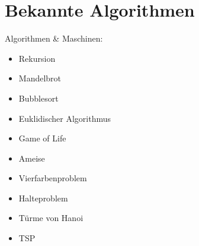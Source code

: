 \section{Bekannte Algorithmen}
%
Algorithmen \& Maschinen:
%
\begin{itemize}
  \item Rekursion
  \item Mandelbrot
  \item Bubblesort
  \item Euklidischer Algorithmus
  \item Game of Life
  \item Ameise
  \item Vierfarbenproblem 
  \item Halteproblem
  \item Türme von Hanoi
  \item TSP
\end{itemize}

